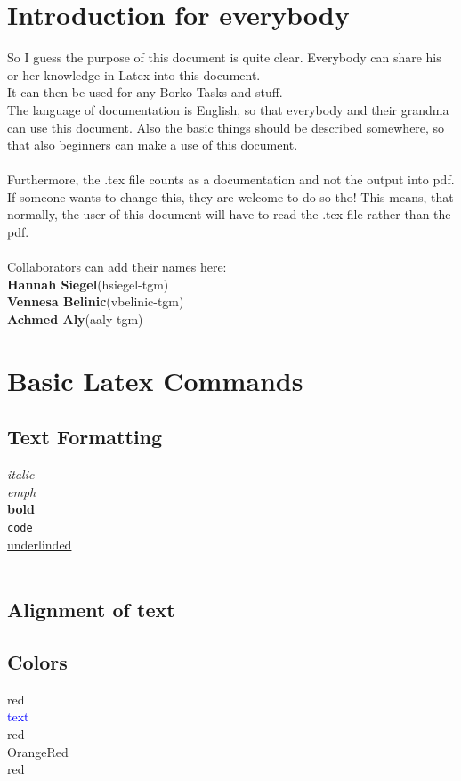 \documentclass[12pt]{article}
\begin{document}
\section{Introduction for everybody}
So I guess the purpose of this document is quite clear. Everybody can share his or her knowledge in Latex into this document. \\
It can then be used for any Borko-Tasks and stuff. \\
The language of documentation is English, so that everybody and their grandma can use this document.
Also the basic things should be described somewhere, so that also beginners can make a use of this document. \\ \\
Furthermore, the .tex file counts as a documentation and not the output into pdf. If someone wants to change this, they are welcome to do so tho! This means, that normally, the user of this document will have to read the .tex file rather than the pdf. \\ \\
Collaborators can add their names here: \\
\textbf{Hannah Siegel}(hsiegel-tgm) \\
\textbf{Vennesa Belinic}(vbelinic-tgm) \\
\textbf{Achmed Aly}(aaly-tgm) \\
\newpage

\section{Basic Latex Commands}
\subsection{Text Formatting}
\textit{italic} \\
\emph{emph} \\
\textbf{bold} \\
\texttt{code} \\
\underline{underlinded} \\
 \\
\subsection{Alignment of text}

\subsection{Colors}
\color{red} 
red \\
\textcolor{blue}{text} \\
red \\
\color{OrangeRed} OrangeRed \\
\color{black} red \\
\end{document}
